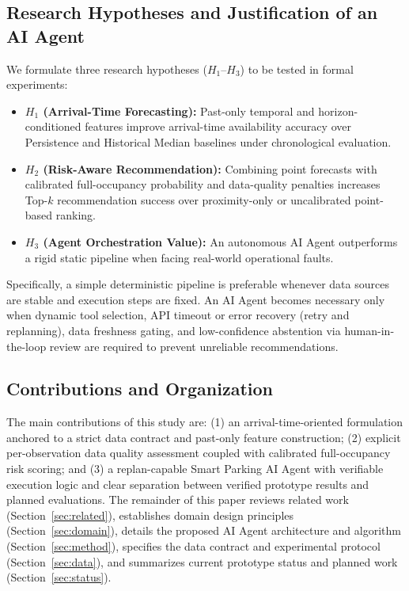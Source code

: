 \documentclass[conference,a4paper]{IEEEtran}
\begin{document}
\subsection{Research Hypotheses and Justification of an AI Agent}
We formulate three research hypotheses ($H_1$--$H_3$) to be tested in formal experiments:
\begin{itemize}
    \item \textbf{$H_1$ (Arrival-Time Forecasting):} Past-only temporal and horizon-conditioned features improve arrival-time availability accuracy over Persistence and Historical Median baselines under chronological evaluation.
    \item \textbf{$H_2$ (Risk-Aware Recommendation):} Combining point forecasts with calibrated full-occupancy probability and data-quality penalties increases Top-$k$ recommendation success over proximity-only or uncalibrated point-based ranking.
    \item \textbf{$H_3$ (Agent Orchestration Value):} An autonomous AI Agent outperforms a rigid static pipeline when facing real-world operational faults.
\end{itemize}
Specifically, a simple deterministic pipeline is preferable whenever data sources are stable and execution steps are fixed. An AI Agent becomes necessary only when dynamic tool selection, API timeout or error recovery (retry and replanning), data freshness gating, and low-confidence abstention via human-in-the-loop review are required to prevent unreliable recommendations.

\subsection{Contributions and Organization}
The main contributions of this study are: (1) an arrival-time-oriented formulation anchored to a strict data contract and past-only feature construction; (2) explicit per-observation data quality assessment coupled with calibrated full-occupancy risk scoring; and (3) a replan-capable Smart Parking AI Agent with verifiable execution logic and clear separation between verified prototype results and planned evaluations. The remainder of this paper reviews related work (Section~\ref{sec:related}), establishes domain design principles (Section~\ref{sec:domain}), details the proposed AI Agent architecture and algorithm (Section~\ref{sec:method}), specifies the data contract and experimental protocol (Section~\ref{sec:data}), and summarizes current prototype status and planned work (Section~\ref{sec:status}).
\end{document}
